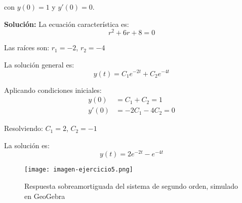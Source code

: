 con $y(0) = 1$ y $y'(0) = 0$.

\textbf{Solución:}
La ecuación característica es:
\begin{equation}
    r^2 + 6r + 8 = 0
\end{equation}

Las raíces son: $r_1 = -2$, $r_2 = -4$

La solución general es:
\begin{equation}
    y(t) = C_1 e^{-2t} + C_2 e^{-4t}
\end{equation}

Aplicando condiciones iniciales:
\begin{align}
    y(0) &= C_1 + C_2 = 1 \\
    y'(0) &= -2C_1 - 4C_2 = 0
\end{align}

Resolviendo: $C_1 = 2$, $C_2 = -1$

La solución es:
\begin{equation}
    y(t) = 2e^{-2t} - e^{-4t}
\end{equation}

\begin{figure}[H]
    \centering
    \texttt{[image: imagen-ejercicio5.png]}
    \caption{Respuesta sobreamortiguada del sistema de segundo orden, simulado en GeoGebra}
\end{figure}